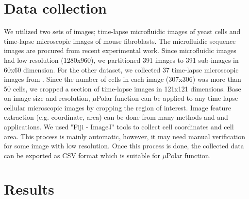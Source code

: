 \documentclass[conference]{IEEEtran}
\begin{document}

\section{Data collection}
 We utilized two sets of images; time-lapse microfluidic images of yeast cells and time-lapse microscopic images of mouse fibroblasts. The microfluidic sequence images are procured from \cite{r13} recent experimental work. Since microfluidic images had low resolution (1280x960), we partitioned 391 images to 391 sub-images in 60x60 dimension. For the other dataset, we collected 37 time-lapse microscopic images from \cite{r20}. Since the number of cells in each image (307x306) was more than 50 cells, we cropped a section of time-lapse images in 121x121 dimensions. Base on image size and resolution, $\mu$Polar function can be applied to any time-lapse cellular microscopic images by cropping the region of interest.
Image feature extraction (e.g. coordinate, area) can be done from many methods and and applications. We used "Fiji - ImageJ" tools to collect cell coordinates and cell area. This process is mainly automatic, however, it may need manual verification for some image with low resolution. Once this process is done, the collected data can be exported as CSV format which is suitable for $\mu$Polar  function.  


\section{Results}
\end{document}

